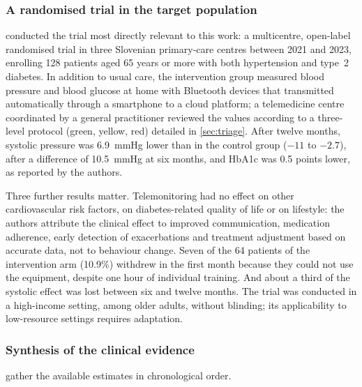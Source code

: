 \subsubsection{A randomised trial in the target population}\label{sec:mihevc}\label{sec:mechanism}\label{sec:feasibility}

\Textcite{mihevc2025} conducted the trial most directly relevant to this work: a multicentre, open-label randomised trial in three Slovenian primary-care centres between 2021 and 2023, enrolling 128 patients aged 65 years or more with both hypertension and type~2 diabetes. In addition to usual care, the intervention group measured blood pressure and blood glucose at home with Bluetooth devices that transmitted automatically through a smartphone to a cloud platform; a telemedicine centre coordinated by a general practitioner reviewed the values according to a three-level protocol (green, yellow, red) detailed in \cref{sec:triage}. After twelve months, systolic pressure was 6.9~mmHg lower than in the control group ($-11$ to $-2.7$), after a difference of 10.5~mmHg at six months, and HbA1c was 0.5 points lower, as reported by the authors.

Three further results matter. Telemonitoring had no effect on other cardiovascular risk factors, on diabetes-related quality of life or on lifestyle: the authors attribute the clinical effect to improved communication, medication adherence, early detection of exacerbations and treatment adjustment based on accurate data, not to behaviour change. Seven of the 64 patients of the intervention arm (10.9\%) withdrew in the first month because they could not use the equipment, despite one hour of individual training. And about a third of the systolic effect was lost between six and twelve months. The trial was conducted in a high-income setting, among older adults, without blinding; its applicability to low-resource settings requires adaptation.

\subsubsection{Synthesis of the clinical evidence}\label{sec:consolidated}

 gather the available estimates in chronological order.


